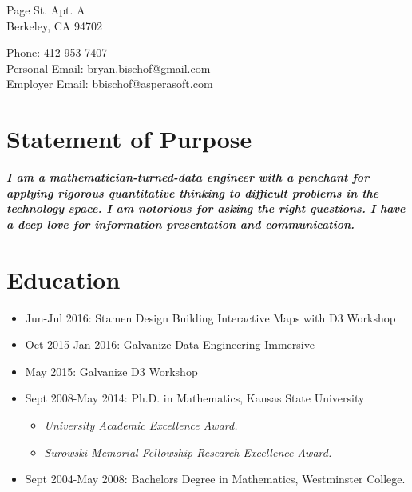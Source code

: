 \documentclass[a4paper,10pt,notitlepage]{article}
\begin{document}
\begin{multicols}{2}{
 Page St. Apt. A\\
Berkeley, CA 94702

\noindent Phone: 412-953-7407\\
Personal Email: bryan.bischof@gmail.com\\
Employer Email: bbischof@asperasoft.com
}
\end{multicols}

\vspace{-10pt}\section*{Statement of Purpose}
\noindent \textit{\textbf{I am a mathematician-turned-data engineer with a penchant for applying rigorous quantitative thinking to difficult problems in the technology space. I am notorious for asking the right questions. I have a deep love for information presentation and communication. }}


\vspace{-10pt}\section*{Education}
\begin{itemize}
	\vspace{-5pt}\item 	Jun-Jul 2016: Stamen Design Building Interactive Maps with D3 Workshop
	\vspace{-5pt}\item	Oct 2015-Jan 2016: Galvanize Data Engineering Immersive 
	\vspace{-5pt}\item	May 2015: Galvanize D3 Workshop
	\vspace{-5pt}\item	Sept 2008-May 2014: Ph.D. in Mathematics, Kansas State University
		\begin{itemize}
		 \vspace{-5pt}\item \textit{University Academic Excellence Award.}
		 \vspace{-5pt}\item \textit{Surowski Memorial Fellowship Research Excellence Award.}
		 \end{itemize}
	\vspace{-5pt}\item	Sept 2004-May 2008: Bachelors Degree in Mathematics, Westminster College.
\end{itemize}
\end{document}
